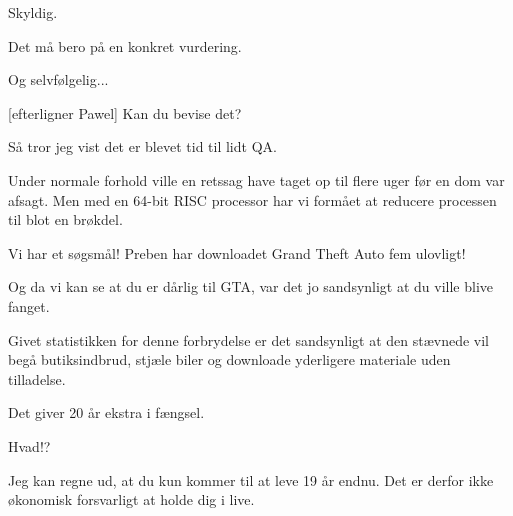 \documentclass[a4paper,11pt]{article}
\begin{document}
\begin{sketch}

 Skyldig.  

 Det må bero på en konkret vurdering.

 Og selvfølgelig...

[efterligner Pawel] Kan du bevise det?

 Så tror jeg vist det er blevet tid til lidt QA.

 Under normale forhold ville en retssag have taget op til flere
uger før en dom var afsagt.  Men med en 64-bit RISC
processor har vi formået at reducere processen til blot en brøkdel.



 Vi har et søgsmål!  Preben har downloadet Grand Theft Auto fem ulovligt!


 Og da vi kan se at du er dårlig til GTA, var det jo sandsynligt at
du ville blive fanget.

 Givet statistikken for denne forbrydelse er det sandsynligt at den stævnede vil
begå butiksindbrud, stjæle biler og downloade yderligere materiale
uden tilladelse.

 Det giver 20 år ekstra i fængsel.

 Hvad!?

 Jeg kan regne ud, at du kun kommer til at leve 19 år endnu.  Det er derfor ikke
økonomisk forsvarligt at holde dig i live.



\end{sketch}
\end{document}
